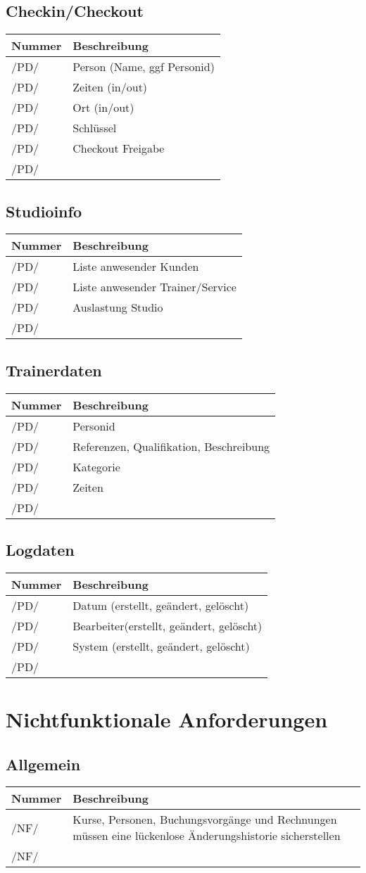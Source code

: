 \documentclass[a4paper,11pt]{article}
\newcommand\addrow[2]{#1 &#2\\ }
\newcommand\addheading[2]{#1 &#2\\ \hline}
\newcommand\tabularhead{\begin{tabular}{lp{13cm}}
\hline
}
\newenvironment{usecase}{\tabularhead}
{\hline\end{tabular}}
\begin{document}
\subsection{Checkin/Checkout}
\begin{usecase}
  \addheading{Nummer}{Beschreibung} 
  \addrow{/PD/}{Person (Name, ggf Personid)}
  \addrow{/PD/}{Zeiten (in/out)}
  \addrow{/PD/}{Ort (in/out)}
  \addrow{/PD/}{Schlüssel}
  \addrow{/PD/}{Checkout Freigabe}
  \addrow{/PD/}{}
\end{usecase}

\subsection{Studioinfo}
\begin{usecase}
  \addheading{Nummer}{Beschreibung} 
  \addrow{/PD/}{Liste anwesender Kunden}
  \addrow{/PD/}{Liste anwesender Trainer/Service}
  \addrow{/PD/}{Auslastung Studio}
  \addrow{/PD/}{}
\end{usecase}

\subsection{Trainerdaten}
\begin{usecase}
  \addheading{Nummer}{Beschreibung} 
  \addrow{/PD/}{Personid}
  \addrow{/PD/}{Referenzen, Qualifikation, Beschreibung}
  \addrow{/PD/}{Kategorie}
  \addrow{/PD/}{Zeiten}
  \addrow{/PD/}{}
\end{usecase}

\subsection{Logdaten}
\begin{usecase}
  \addheading{Nummer}{Beschreibung} 
  \addrow{/PD/}{Datum (erstellt, geändert, gelöscht)}
  \addrow{/PD/}{Bearbeiter(erstellt, geändert, gelöscht)}
  \addrow{/PD/}{System (erstellt, geändert, gelöscht)}
  \addrow{/PD/}{}
\end{usecase}

\section{Nichtfunktionale Anforderungen}
\subsection{Allgemein}
\begin{usecase}
  \addheading{Nummer}{Beschreibung} 
  \addrow{/NF/}{Kurse, Personen, Buchungsvorgänge und Rechnungen müssen eine lückenlose Änderungshistorie sicherstellen}
  \addrow{/NF/}{}
\end{usecase}
\end{document}

